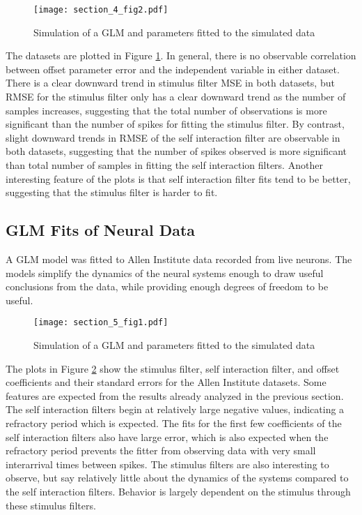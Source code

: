\documentclass[letterpaper,titlepage,10pt]{article}
\begin{document}
\begin{figure}[H]
\texttt{[image: section\_4\_fig2.pdf]}
\caption{Simulation of a GLM and parameters fitted to the simulated data}
\label{fig42}
\end{figure}

The datasets are plotted in Figure \ref{fig42}. In general, there is no observable correlation between offset parameter
error and the independent variable in either dataset. There is a clear downward trend in stimulus filter MSE in both
datasets, but RMSE for the stimulus filter only has a clear downward trend as the number of samples increases,
suggesting that the total number of observations is more significant than the number of spikes for fitting the stimulus
filter. By contrast, slight downward trends in RMSE of the self interaction filter are observable in both datasets,
suggesting that the number of spikes observed is more significant than total number of samples in fitting the self
interaction filters. Another interesting feature of the plots is that self interaction filter fits tend to be better,
suggesting that the stimulus filter is harder to fit.

\subsection{GLM Fits of Neural Data}

A GLM model was fitted to Allen Institute data recorded from live neurons. The models simplify the dynamics of the
neural systems enough to draw useful conclusions from the data, while providing enough degrees of freedom to be useful.

\begin{figure}[H]
\texttt{[image: section\_5\_fig1.pdf]}
\caption{Simulation of a GLM and parameters fitted to the simulated data}
\label{fig51}
\end{figure}

The plots in Figure \ref{fig51} show the stimulus filter, self interaction filter, and offset coefficients and their
standard errors for the Allen Institute datasets. Some features are expected from the results already analyzed in the
previous section. The self interaction filters begin at relatively large negative values, indicating a refractory
period which is expected. The fits for the first few coefficients of the self interaction filters also have large
error, which is also expected when the refractory period prevents the fitter from observing data with very small
interarrival times between spikes. The stimulus filters are also interesting to observe, but say relatively little
about the dynamics of the systems compared to the self interaction filters. Behavior is largely dependent on the
stimulus through these stimulus filters.
\end{document}
